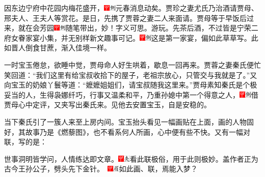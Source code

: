 因东边宁府中花园内梅花盛开，{\includegraphics[width=3mm]{../Images/00002}\includegraphics[width=3mm]{../Images/00011}\footnotesize \kaishu 元春消息动矣。}贾珍之妻尤氏乃治酒请贾母、邢夫人、王夫人等赏花。是日，先携了贾蓉之妻二人来面请。贾母等于早饭后过来，就在会芳园{\includegraphics[width=3mm]{../Images/00002}\includegraphics[width=3mm]{../Images/00011}\footnotesize \kaishu 随笔带出，妙！字义可思。}游玩。先茶后酒，不过皆是宁荣二府女眷家宴小集，并无别样新文趣事可记。{\includegraphics[width=3mm]{../Images/00002}\includegraphics[width=3mm]{../Images/00011}\footnotesize \kaishu 这是第一家宴，偏如此草草写。此如晋人倒食甘蔗，渐入佳境一样。}

一时宝玉倦怠，欲睡中觉，贾母命人好生哄着，歇息一回再来。贾蓉之妻秦氏便忙笑回道：``我们这里有给宝叔收拾下的屋子，老祖宗放心，只管交与我就是了。''又向宝玉的奶娘丫鬟等道：``嬷嬷姐姐们，请宝叔随我这里来。''贾母素知秦氏是个极妥当的人，生得袅娜纤巧，行事又温柔和平，乃重孙媳中第一个得意之人，{\includegraphics[width=3mm]{../Images/00002}\includegraphics[width=3mm]{../Images/00011}\footnotesize \kaishu 借贾母心中定评，又夹写出秦氏来。}见他去安置宝玉，自是安稳的。

当下秦氏引了一簇人来至上房内间。宝玉抬头看见一幅画贴在上面，画的人物固好，其故事乃是《燃藜图》，也不看系何人所画，心中便有些不快。又有一幅对联，写的是：

世事洞明皆学问，人情练达即文章。{\includegraphics[width=3mm]{../Images/00002}\includegraphics[width=3mm]{../Images/00012}\footnotesize \kaishu 看此联极俗，用于此则极妙。盖作者正为古今王孙公子，劈头先下金针。　\includegraphics[width=3mm]{../Images/00002}\includegraphics[width=3mm]{../Images/00010}\footnotesize \kaishu 如此画、联，焉能入梦？}

